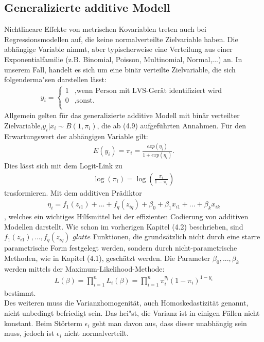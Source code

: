 \documentclass[12pt]{scrreprt}
\begin{document}
\subsection{Generalizierte additive Modell}
Nichtlineare Effekte von metrischen Kovariablen treten auch bei Regressionsmodellen auf, die keine normalverteilte Zielvariable haben. Die abhängige Variable nimmt, aber typischerweise eine Verteilung aus einer Exponentialfamilie (z.B. Binomial, Poisson, Multinomial, Normal,...) an.  In unserem Fall, handelt es sich um eine binär verteilte Zielvariable, die sich folgenderma"sen darstellen lässt:\\
\begin{align}
y_{i}=\begin{cases}
1 & \text{,wenn Person mit LVS-Gerät identifiziert wird } \\
0 & \text{,sonst.} \\
\end{cases}
\end{align}
Allgemein gelten für das generalizierte additive Modell mit binär verteilter Zielvariable,\enspace $y_{i}|x_{i}\sim B(1,\pi_{i})$, die ab (4.9) aufgeführten Annahmen.
Für den Erwartungswert der abhängigen Variable gilt:
\begin{align}
E(y_{i})=\pi_{i}=\frac{exp(\eta_{i})}{1+exp(\eta_{i})}.
\end{align}
Dies lässt sich mit dem Logit-Link zu
\begin{align}
\log(\pi_{i})=\log(\frac{\pi_{i}}{1-\pi_{i}})
\end{align}
trasformieren.
Mit dem additiven Prädiktor
\begin{align}
\eta_{i}= f_{1}(z_{i1})+...+f_{q}(z_{iq})+\beta_{0}+\beta_{1}x_{i1}+...+\beta_{k}x_{ik}
\end{align}
, welches ein wichtiges Hilfsmittel bei der effizienten Codierung  von additiven Modellen darstellt. Wie schon im vorherigen Kapitel (4.2) beschrieben, sind $f_{1}(z_{i1}),...,f_{q}(z_{iq})$ $glatte$ Funktionen, die grundsätzlich nicht durch eine starre parametrische Form festgelegt werden, sondern durch nicht-parametrische Methoden, wie in Kapitel (4.1), geschätzt werden. Die Parameter $\beta_{0},...,\beta_{k}$ werden mittels der Maximum-Likelihood-Methode:
\begin{align}
L(\beta)=\prod_{i=1}^{n}L_{i}(\beta)=\prod_{i=1}^{n}\pi_{i}^{y_{i}}(1-\pi_{i})^{1-y_{i}}
\end{align}
bestimmt. \\
Des weiteren muss die Varianzhomogenität, auch Homoskedastizität genannt, nicht unbedingt befriedigt sein. Das hei"st, die Varianz ist in einigen Fällen nicht konstant. Beim Störterm $\epsilon_{i}$ geht man davon aus, dass dieser unabhängig sein muss, jedoch ist $\epsilon_{i}$ nicht normalverteilt. \\
\end{document}
